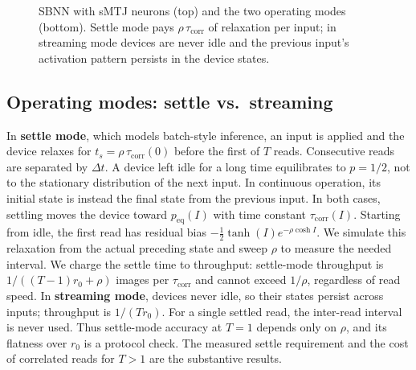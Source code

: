 \documentclass[journal]{IEEEtran}
\newcommand{\rzero}{r_0}
\newcommand{\tauc}{\tau_{\mathrm{corr}}}
\begin{document}
\begin{figure}[t]
\caption{SBNN with sMTJ neurons (top) and the two operating modes
(bottom). Settle mode pays $\rho\,\tauc$ of relaxation per input; in
streaming mode devices are never idle and the previous input's activation
pattern persists in the device states.}
\label{fig:modes}
\end{figure}

\subsection{Operating modes: settle vs.\ streaming}
\label{sec:modes}
In \textbf{settle mode}, which models batch-style inference, an input is
applied and the device relaxes for $t_s=\rho\,\tauc(0)$ before the first of
$T$ reads. Consecutive reads are separated by $\Delta t$. A device left idle
for a long time equilibrates to $p=1/2$, not to the stationary distribution
of the next input. In continuous operation, its initial state is instead
the final state from the previous input. In both cases, settling moves the
device toward $p_{\mathrm{eq}}(I)$ with time constant $\tauc(I)$. Starting
from idle, the first read has residual bias
$-\tfrac{1}{2}\tanh(I)e^{-\rho\cosh I}$. We simulate this relaxation from
the actual preceding state and sweep $\rho$ to measure the needed interval.
We charge the settle time to throughput: settle-mode throughput is
$1/((T{-}1)\rzero+\rho)$ images per $\tauc$ and cannot exceed $1/\rho$,
regardless of read speed. In \textbf{streaming mode}, devices never idle,
so their states persist across inputs; throughput is $1/(T\rzero)$. For a
single settled read, the inter-read interval is never used. Thus
settle-mode accuracy at $T{=}1$ depends only on $\rho$, and its flatness
over $\rzero$ is a protocol check. The measured settle requirement and the
cost of correlated reads for $T{>}1$ are the substantive results.
\end{document}
